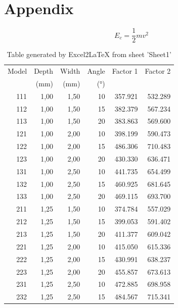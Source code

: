 \documentclass[10pt,a4paper,twoside]{article}
\begin{document}

\vfill
\newpage
\section{Appendix}
\setcounter{page}{1}
\begin{equation}
E_c=\frac{1}{2}mv^2
\label{eqn:bua}
\end{equation}

\begin{table}[ht!] 
  \centering
\begin{threeparttable}

  \caption{Table generated by Excel2LaTeX from sheet 'Sheet1'}

    \begin{tabular}{rrrrrr}
    \toprule
    Model & Depth & Width & Angle & Factor 1 & Factor 2 \\
	& (mm) & (mm) & (°)  &  &  \\
    \midrule
    111   & 1,00  & 1,50  & 10\tnote{a}   & 357.921 & 532.289 \\
    112   & 1,00  & 1,50  & 15   & 382.379 & 567.234 \\
    113   & 1,00  & 1,50  & 20   & 383.863 & 569.600 \\
    121   & 1,00  & 2,00  & 10   & 398.199 & 590.473 \\
    122   & 1,00  & 2,00  & 15   & 486.306 & 710.483 \\
    123   & 1,00  & 2,00  & 20   & 430.330 & 636.471 \\
    131   & 1,00  & 2,50  & 10   & 441.735 & 654.499 \\
    132   & 1,00  & 2,50  & 15   & 460.925 & 681.645 \\
    133   & 1,00  & 2,50  & 20   & 469.115 & 693.700 \\
    211   & 1,25  & 1,50  & 10   & 374.784 & 557.029 \\
    212   & 1,25  & 1,50  & 15   & 399.053\tnote{b} & 591.402 \\
    213   & 1,25  & 1,50  & 20   & 411.377 & 609.042 \\
    221   & 1,25  & 2,00  & 10   & 415.050 & 615.336 \\
    222   & 1,25  & 2,00  & 15   & 430.991 & 638.237 \\
    223   & 1,25  & 2,00  & 20   & 455.857 & 673.613 \\
    231   & 1,25  & 2,50  & 10   & 472.885 & 698.958 \\
    232   & 1,25  & 2,50  & 15   & 484.567 & 715.341 \\

\end{tabular}
\end{threeparttable}
\end{table}
\end{document}
